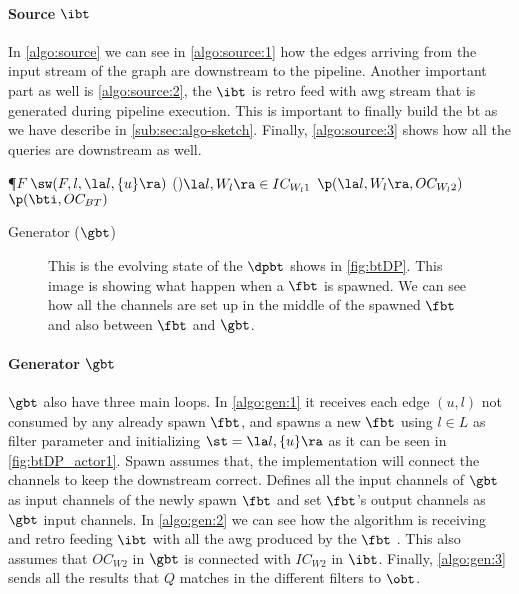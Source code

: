 \paragraph{Source $\ibt$} In \autoref{algo:source} we can see in \autoref{algo:source:1} how the edges arriving from the input stream of the graph are downstream to the pipeline. 
Another important part as well is \autoref{algo:source:2}, the $\ibt$ is retro feed with \acrshort{awg} stream that is generated during pipeline execution.
This is important to finally build the \acrshort{bt} as we have describe in \autoref{sub:sec:algo-sketch}. Finally, \autoref{algo:source:3} shows how all the queries are downstream as well.

\begin{algorithm}
\SetAlgoRefName{[A2]}
\P{$F$}
{$\sw(F, l, \la l, \{u\} \ra)$ \label{algo:gen:1}
}
\ForAll(){$\la l, W_l \ra \in IC_{W_l1}$}
{$\p(\la l, W_l \ra, OC_{W_l2})$ \label{algo:gen:2}
}
{$\p(\bti, OC_{BT})$ \label{algo:gen:3}
}
\caption{Generator ($\gbt$)}
\label{algo:gen}
\end{algorithm}

\begin{figure}[h]
\centering  
{}
\caption[{[\acrshort{iebt}] ]$\dpbt$ With Filter instances}]{This is the evolving state of the $\dpbt$ shows in \autoref{fig:btDP}. This image is showing what happen when a $\fbt$ is spawned. We can see how all the channels are set up in the middle of the spawned $\fbt$ and also between $\fbt$ and $\gbt$.}
\label{fig:btDP_actor1}
\end{figure}

\paragraph{Generator $\gbt$} $\gbt$ also have three main loops. In \autoref{algo:gen:1} it receives each edge $(u,l)$ not consumed by any already spawn  $\fbt$, and 
spawns a new $\fbt$ using $l \in L$ as filter parameter and initializing $\st = \la l, \{u\} \ra$ as it can be seen in \autoref{fig:btDP_actor1}. 
Spawn assumes that, the implementation will connect the channels to keep the downstream correct. Defines all the input channels of $\gbt$ as input channels of the newly spawn $\fbt$ and set $\fbt$'s output channels as $\gbt$ input channels.
In \autoref{algo:gen:2} we can see how the algorithm is receiving and retro feeding $\ibt$ with all the \acrshort{awg} produced by the $\fbt$ . This also assumes that $OC_{W2}$ in $\gbt$ 
is connected with $IC_{W2}$ in $\ibt$.
Finally, \autoref{algo:gen:3} sends all the results that $Q$ matches in the different filters to $\obt$.


